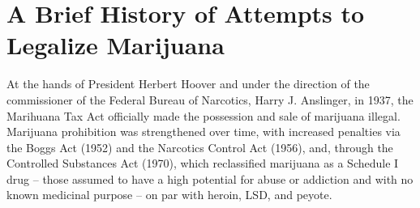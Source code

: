 




\section{A Brief History of Attempts to Legalize Marijuana}

At the hands of President Herbert Hoover and under the direction of the commissioner of the Federal Bureau of Narcotics, Harry J. Anslinger, in 1937, the Marihuana Tax Act officially made the possession and sale of marijuana illegal. Marijuana prohibition was strengthened over time, with increased penalties via the Boggs Act (1952) and the Narcotics Control Act (1956), and, through the Controlled Substances Act (1970), which reclassified marijuana as a Schedule I drug -- those assumed to have a high potential for abuse or addiction and with no known medicinal purpose -- on par with heroin, LSD, and peyote. 



